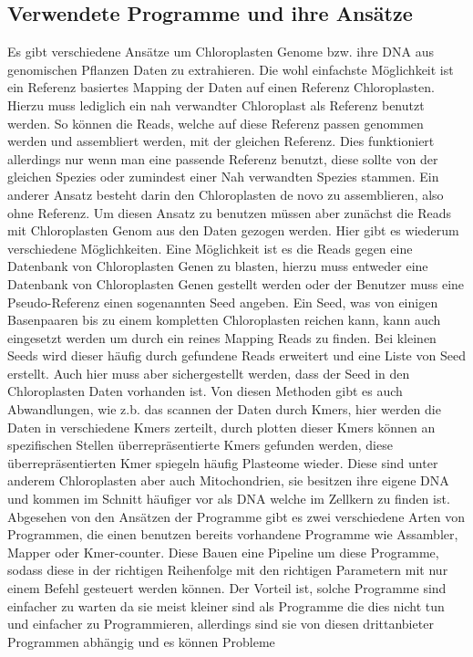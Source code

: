 \documentclass{scrartcl}
\begin{document}
\subsection{Verwendete Programme und ihre Ansätze}
\label{sec-1-5}
Es gibt verschiedene Ansätze um Chloroplasten Genome bzw. ihre DNA aus genomischen Pflanzen Daten zu extrahieren. Die wohl einfachste Möglichkeit ist ein Referenz basiertes
Mapping der Daten auf einen Referenz Chloroplasten. Hierzu muss lediglich ein nah verwandter Chloroplast als Referenz benutzt werden. So können die Reads, welche auf diese Referenz
passen genommen werden und assembliert werden, mit der gleichen Referenz. Dies funktioniert allerdings nur wenn man eine passende Referenz benutzt, diese sollte von der gleichen Spezies oder
zumindest einer Nah verwandten Spezies stammen. Ein anderer Ansatz besteht darin den Chloroplasten de novo zu assemblieren, also ohne Referenz. Um diesen Ansatz zu benutzen müssen
aber zunächst die Reads mit Chloroplasten Genom aus den Daten gezogen werden. Hier gibt es wiederum verschiedene Möglichkeiten. Eine Möglichkeit ist es die Reads gegen eine Datenbank
von Chloroplasten Genen zu blasten, hierzu muss entweder eine Datenbank von Chloroplasten Genen gestellt werden oder der Benutzer muss eine Pseudo-Referenz einen sogenannten Seed angeben.
Ein Seed, was von einigen Basenpaaren bis zu einem kompletten Chloroplasten reichen kann, kann auch eingesetzt werden um durch ein reines Mapping Reads zu finden. Bei kleinen Seeds wird dieser
häufig durch gefundene Reads erweitert und eine Liste von Seed erstellt. Auch hier muss aber sichergestellt werden, dass der Seed in den Chloroplasten Daten vorhanden ist.
Von diesen Methoden gibt es auch Abwandlungen, wie z.b. das scannen der Daten durch Kmers, hier werden die Daten in verschiedene Kmers zerteilt, durch plotten dieser Kmers können
an spezifischen Stellen überrepräsentierte Kmers gefunden werden, diese überrepräsentierten Kmer spiegeln häufig Plasteome wieder. Diese sind unter anderem Chloroplasten aber auch
Mitochondrien, sie besitzen ihre eigene DNA und kommen im Schnitt häufiger vor als DNA welche im Zellkern zu finden ist. 
Abgesehen von den Ansätzen der Programme gibt es zwei verschiedene Arten von Programmen, die einen benutzen bereits vorhandene Programme wie Assambler, Mapper oder Kmer-counter. Diese 
Bauen eine Pipeline um diese Programme, sodass diese in der richtigen Reihenfolge mit den richtigen Parametern mit nur einem Befehl gesteuert werden können. Der Vorteil ist, solche Programme
sind einfacher zu warten da sie meist kleiner sind als Programme die dies nicht tun und einfacher zu Programmieren, allerdings sind sie von diesen drittanbieter Programmen abhängig und es können Probleme 
\end{document}
